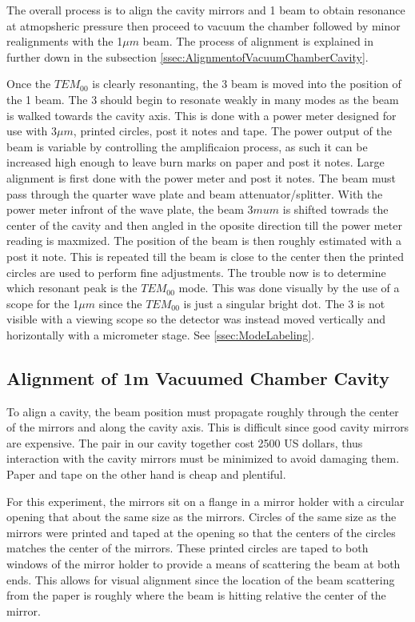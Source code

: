 \documentclass[a4paper]{book}
\begin{document}
The overall process is to align the cavity mirrors and 1 beam to obtain resonance at atmopsheric pressure then proceed to vacuum the chamber followed by minor realignments with the 1$\mu m$ beam.  The process of alignment is explained in further down in the subsection \ref{ssec:AlignmentofVacuumChamberCavity}.

Once the $TEM_{00}$ is clearly resonanting, the 3 beam is moved into the position of the 1 beam. The 3 should begin to resonate weakly in many modes as the beam is walked towards the cavity axis. This is done with a power meter designed for use with 3$\mu m$, printed circles, post it notes and tape. The power output of the beam is variable by controlling the amplificaion process, as such it can be increased high enough to leave burn marks on paper and post it notes. Large alignment is first done with the power meter and post it notes. The beam must pass through the quarter wave plate and beam attenuator/splitter. With the power meter infront of the wave plate, the beam 3$mu m$ is shifted towrads the center of the cavity and then angled in the oposite direction till the power meter reading is maxmized. The position of the beam is then roughly estimated with a post it note. This is repeated till the beam is close to the center then the printed circles are used to perform fine adjustments.  The trouble now is to determine which resonant peak is the $TEM_{00}$ mode. This was done visually by the use of a scope for the 1$\mu m$ since the $TEM_{00}$ is just a singular bright dot. The 3 is not visible with a viewing scope so  the detector was instead moved vertically and horizontally with a micrometer stage. See \ref{ssec:ModeLabeling}.

\subsection{Alignment of 1m Vacuumed Chamber Cavity}
\label{ssec:Alignment of Vacuumed Chamber Cavity}
To align a cavity, the beam position must propagate roughly through the center of the mirrors and along the cavity axis. This is difficult since good cavity mirrors are expensive. The pair in our cavity together cost 2500 US dollars, thus interaction with the cavity mirrors must be minimized to avoid damaging them. Paper and tape on the other hand is cheap and plentiful. 

For this experiment, the mirrors sit on a flange in a mirror holder with a circular opening that about the same size as the mirrors. Circles of the same size as the mirrors were printed and taped at the opening so that the centers of the circles matches the center of the mirrors. These printed circles are taped to both windows of the mirror holder to provide a means of scattering the beam at both ends. This allows for visual alignment since the location of the beam scattering from the paper is roughly where the beam is hitting relative the center of the mirror. 
\end{document}
